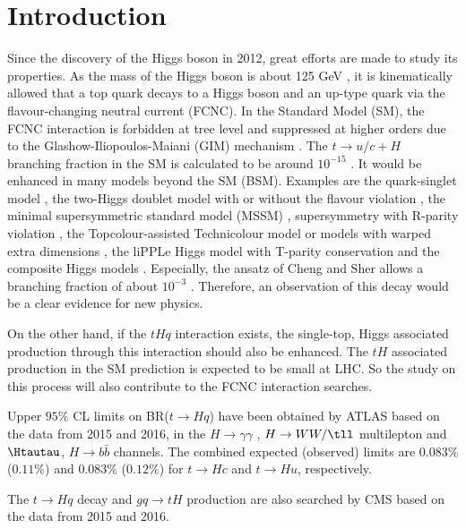 \section{Introduction}
Since the discovery of the Higgs boson in 2012, great efforts are made to study its properties. As the mass of the Higgs boson is about 125 GeV \cite{HiggsMass}, it is kinematically allowed that a top quark decays to a Higgs boson and an up-type quark via the flavour-changing neutral current (FCNC). In the Standard Model (SM), the FCNC interaction is forbidden at tree level and suppressed at higher orders due to the Glashow-Iliopoulos-Maiani (GIM) mechanism \cite{GIM}. The $t\to u/c+H$ branching fraction in the SM is calculated to be around $10^{-15}$ \cite{brtch3}. It would be enhanced in many models beyond the SM (BSM). Examples are the quark-singlet model \cite{quarkSinglet1,quarkSinglet2}, the two-Higgs doublet model with or without the flavour violation \cite{2hdm1,2hdm2}, the minimal supersymmetric standard model (MSSM) \cite{2hdm3}, supersymmetry with R-parity violation \cite{Rparity},
the Topcolour-assisted Technicolour model \cite{Techni} or models with warped extra dimensions \cite{extraD}, the liPPLe Higgs model with T-parity conservation \cite{liPPLeH} and the composite Higgs models \cite{compositeH}.
Especially, the ansatz of Cheng and Sher \cite{Sher} allows a branching fraction of about $10^{-3}$ \cite{FCNC_rate}. Therefore, an observation of this decay would be a clear evidence for new physics.

On the other hand, if the $tHq$ interaction exists, the single-top, Higgs associated production through this interaction should also be enhanced. The $tH$ associated production in the SM prediction is expected to be small at LHC\cite{tHjb_production}. So the study on this process will also contribute to the FCNC interaction searches.

Upper $95\%$ CL limits on BR($t\to Hq$) have been obtained by ATLAS based on the data from 2015 and 2016, in the $H\to\gamma\gamma$ \cite{fcncgmgm}, $H\to WW/\tll$ multilepton \cite{fcncml} and  $\Htautau$, $H\to b\bar{b}$ \cite{fcnctautau} channels. The combined expected (observed) limits are $0.083\%$ ($0.11\%$) and $0.083\%$ ($0.12\%$) for $t\to Hc$ and $t\to Hu$, respectively.

The $t\to Hq$ decay and $gq\to tH$ production are also searched by CMS based on the data from 2015 and 2016\cite{CMS-TOP-17-003}. 

